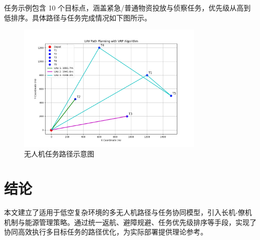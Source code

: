 \documentclass[12pt]{ctexart}
\begin{document}
任务示例包含 10 个目标点，涵盖紧急/普通物资投放与侦察任务，优先级从高到低排序。具体路径与任务完成情况如下图所示。

\begin{figure}[h]
    \centering
    \includegraphics[width=0.8\textwidth]{example-path.png}
    \caption{无人机任务路径示意图}
\end{figure}

\section{结论}
本文建立了适用于低空复杂环境的多无人机路径与任务协同模型，引入长机-僚机机制与能源管理策略。通过统一返航、避障规避、任务优先级排序等手段，实现了协同高效执行多目标任务的路径优化，为实际部署提供理论参考。
\end{document}
